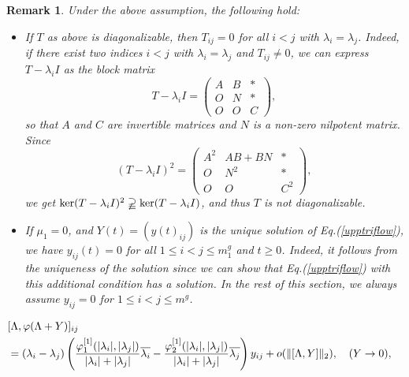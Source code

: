 \documentclass[10pt,a4paper]{amsart}
\newtheorem{remark}{Remark}
\begin{document}
\begin{remark}\label{diagonalizable} 
Under the above assumption, the following hold: 
\begin{itemize}
\item[(1)] If $T$ as above is diagonalizable, then $T_{ij}=0$ for all $i<j$ with $\lambda_i=\lambda_j$.   
	Indeed, if there exist two indices $i<j$ with $\lambda_i=\lambda_j$ and $T_{ij}\neq 0$, 
	we can express $T-\lambda_iI$ as the block matrix 
	\[T-\lambda_iI=\left(
	\begin{array}{ccc}
		A &B &*  \\
		O &N &*  \\
		O &O &C 
	\end{array}
	\right),
	\]
	so that $A$ and $C$ are invertible matrices and $N$ is a non-zero nilpotent matrix. 
	Since \[(T-\lambda_iI)^2=\left(
	\begin{array}{ccc}
		A^2 &AB+ BN&*  \\
		O &N^2 &*  \\
		O &O &C^2 
	\end{array}
	\right),
	\]
	we get $\ker (T-\lambda_i I)^2\varsupsetneqq\ker (T-\lambda_i I)$, and thus $T$ is not diagonalizable. 
\item[(2)] If $\mu_1=0$, and $Y(t)=(y(t)_{ij})$ is the unique solution of Eq.(\ref{upptriflow}), 
we have $y_{ij}(t)=0$ for all $1\leq i<j\leq m^g_1$ and $t\geq 0$. 
Indeed, it follows from the uniqueness of the solution since we can show that Eq.(\ref{upptriflow}) with 
this additional condition has a solution. 
In the rest of this section, we always assume $y_{ij}=0$ for $1\leq i<j\leq m^g$. 
\end{itemize}
\end{remark}	

\begin{align}\label{criterion}
\lefteqn{[\Lambda,\varphi(\Lambda+Y)]_{ij}} \\
	 &=(\lambda_i-\lambda_j)\left(  \frac{\varphi^{[1]}_1(|\lambda_i|,|\lambda_j|)}{|\lambda_i|+|\lambda_j|}\overline{\lambda_i}
	 -\frac{\varphi^{[1]}_2(|\lambda_i|,|\lambda_j|)}{|\lambda_i|+|\lambda_j|}\overline{\lambda_j}\right)y_{ij}
	 +o(\|[\Lambda,Y]\|_2),\quad (Y\to 0),\nonumber
\end{align}
\end{document}
